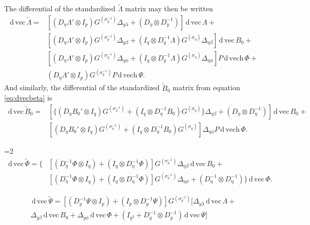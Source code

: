 \documentclass[a4paper,11pt]{article}
\newcommand{\n}{\eta}
\renewcommand{\l}{\lambda}
\renewcommand{\b}{\beta}
\newcommand{\p}{\phi}
\renewcommand{\d}{\,\mathrm{d}\,}
\newcommand{\kronprod}{\otimes}
\renewcommand{\vec}{\mathrm{vec}\,}
\newcommand{\vech}{\mathrm{vech}\,}
\newcommand{\Lambdastan}{\tilde{\Lambda}}
\newcommand{\Bstan}{\tilde{B}}
\newcommand{\Phistan}{\tilde{\Phi}}
\newcommand{\Psistan}{\tilde{\Psi}}
\newcommand{\0}{\boldsymbol{0}}
\begin{document}
The differential of the standardized $\Lambdastan$ matrix may then be written
\begin{equation}\label{eq:dveclam_final}
\begin{split}
  \d\vec\Lambdastan = 
     & [(D_\n \Lambda' \kronprod I_p) G^{(\sigma^{-1}_y)} \Delta_{y\l} + 
        (D_\n \kronprod D_y^{-1})] 
        \d\vec\Lambda +\\
     & [(D_\n \Lambda' \kronprod I_p) G^{(\sigma^{-1}_y)} \Delta_{y\b} + 
        (I_q \kronprod D_y^{-1}\Lambda) G^{(\sigma_\n)} \Delta_{\n\b} ] 
        \d\vec B_0 +\\
     & [(D_\n \Lambda' \kronprod I_p) G^{(\sigma^{-1}_y)} \Delta_{y\phi} + 
        (I_q \kronprod D_y^{-1}\Lambda) G^{(\sigma_\n)} \Delta_{\n\p} ] 
       P \d\vech \Phi +\\
     & (D_\n \Lambda' \kronprod I_p) G^{(\sigma^{-1}_y)} 
       P \d\vech \Psi.
\end{split}\end{equation}
And similarly, the differential of the standardized $\Bstan_0$ matrix from
equation \ref{eq:dvecbeta} is
\begin{equation}\label{eq:dvecbeta_final}
\begin{split}
  \d\vec \Bstan_0 =
     & [\{(D_\n B_0' \kronprod I_q) G^{(\sigma^{-1}_\n)}  + 
        (I_q \kronprod D_\n^{-1}B_0) G^{(\sigma_\n)} \} \Delta_{\n\b} +
           (D_\n \kronprod D_\n^{-1})  ] 
        \d\vec B_0 +\\
     & [(D_\n B_0' \kronprod I_q) G^{(\sigma^{-1}_\n)}  + 
        (I_q \kronprod D_\n^{-1}B_0) G^{(\sigma_\n)} ] \Delta_{\n\p} 
       P \d\vech \Phi.
\end{split}\end{equation}

=2
\begin{equation}\label{eq:dvecphi_final}
\begin{split}
  \d\vec \Phistan = \{
     & [  (D^{-1}_\n \Phi \kronprod I_q)  + (I_q \kronprod D_\n^{-1}\Phi)  ] G^{(\sigma^{-1}_\n)} \Delta_{\n\b}        \d\vec B_0 +\\
     & [(D^{-1}_\n \Phi \kronprod I_q)  + (I_q \kronprod D_\n^{-1}\Phi)  ]  G^{(\sigma^{-1}_\n)} \Delta_{\n\p}   +    (D_\n^{-1} \kronprod D_\n^{-1})
     \}   \d\vec \Phi.
\end{split}\end{equation}

\begin{equation}\label{eq:dvecpsi_final}
\begin{split}
  \d\vec \Psistan = 
   [(D^{-1}_y \Psi \kronprod I_p)  + (I_p \kronprod D_y^{-1}\Psi)  ]  G^{(\sigma^{-1}_y)} 
   [
   \Delta_{y\l} \d\vec\Lambda +\\
   \Delta_{y\b}         \d\vec B_0 +
   \Delta_{y\phi}         \d\vec \Phi +
   (I_{q^2}  + D^{-1}_y \kronprod D^{-1}_y) \d\vec \Psi
   ]
\end{split}\end{equation}
\fi
\end{document}
